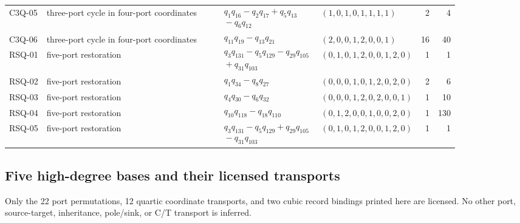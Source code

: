 \begin{longtable}{l L{.16\linewidth} L{.34\linewidth} L{.18\linewidth} r r}
C3Q-05 & three-port cycle in four-port coordinates & $\begin{aligned}&\quad q_{1}q_{16}-q_{2}q_{17}+q_{5}q_{13}\\&\quad -q_{6}q_{12}\end{aligned}$ & $(1,0,1,0,1,1,1,1)$ & 2 & 4\\
C3Q-06 & three-port cycle in four-port coordinates & $\begin{aligned}&\quad q_{11}q_{19}-q_{13}q_{21}\end{aligned}$ & $(2,0,0,1,2,0,0,1)$ & 16 & 40\\
RSQ-01 & five-port restoration & $\begin{aligned}&\quad q_{3}q_{131}-q_{5}q_{129}-q_{29}q_{105}\\&\quad +q_{31}q_{103}\end{aligned}$ & $(0,1,0,1,2,0,0,1,2,0)$ & 1 & 1\\
RSQ-02 & five-port restoration & $\begin{aligned}&\quad q_{1}q_{34}-q_{8}q_{27}\end{aligned}$ & $(0,0,0,1,0,1,2,0,2,0)$ & 2 & 6\\
RSQ-03 & five-port restoration & $\begin{aligned}&\quad q_{4}q_{30}-q_{6}q_{32}\end{aligned}$ & $(0,0,0,1,2,0,2,0,0,1)$ & 1 & 10\\
RSQ-04 & five-port restoration & $\begin{aligned}&\quad q_{10}q_{118}-q_{18}q_{110}\end{aligned}$ & $(0,1,2,0,0,1,0,0,2,0)$ & 1 & 130\\
RSQ-05 & five-port restoration & $\begin{aligned}&\quad q_{3}q_{131}-q_{5}q_{129}+q_{29}q_{105}\\&\quad -q_{31}q_{103}\end{aligned}$ & $(0,1,0,1,2,0,0,1,2,0)$ & 1 & 1\\
\bottomrule
\end{longtable}
\endgroup

\subsection{Five high-degree bases and their licensed transports}

Only the 22 port permutations, 12 quartic coordinate transports, and two cubic record bindings printed here are licensed.  No other port, source-target, inheritance, pole/sink, or C/T transport is inferred.

